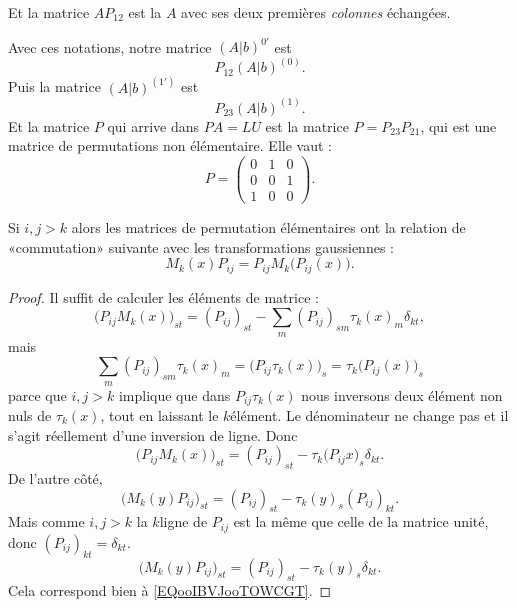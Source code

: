 Et la matrice \( AP_{12}\) est la \( A\) avec ses deux premières \emph{colonnes} échangées.

Avec ces notations, notre matrice \( (A|b)^{0'}\) est
\begin{equation}
	P_{12}(A|b)^{(0)}.
\end{equation}
Puis la matrice \( (A|b)^{(1')}\) est
\begin{equation}
	P_{23}(A|b)^{(1)}.
\end{equation}
Et la matrice \( P\) qui arrive dans \( PA=LU\) est la matrice \(P= P_{23}P_{21}\), qui est une matrice de permutations non élémentaire. Elle vaut :
\begin{equation}
	P=\begin{pmatrix}
		0 & 1 & 0 \\
		0 & 0 & 1 \\
		1 & 0 & 0
	\end{pmatrix}.
\end{equation}

\begin{lemma}        \label{LEMooYIYIooYhnaOt}
	Si \( i,j>k\) alors les matrices de permutation élémentaires ont la relation de «commutation» suivante avec les transformations gaussiennes :
	\begin{equation}
		M_k(x)P_{ij}=P_{ij}M_k\big(  P_{ij}(x) \big).
	\end{equation}
\end{lemma}

\begin{proof}
	Il suffit de calculer les éléments de matrice :
	\begin{equation}
		\big( P_{ij}M_k(x) \big)_{st}=(P_{ij})_{st}-\sum_m(P_{ij})_{sm}\tau_k(x)_{m}\delta_{kt},
	\end{equation}
	mais
	\begin{equation}
		\sum_m(P_{ij})_{sm}\tau_k(x)_{m}=\big( P_{ij}\tau_k(x) \big)_s=\tau_k\big( P_{ij}(x) \big)_s
	\end{equation}
	parce que \( i,j>k\) implique que dans \( P_{ij}\tau_k(x)\) nous inversons deux élément non nuls de \( \tau_k(x)\), tout en laissant le \( k\)\ieme élément. Le dénominateur ne change pas et il s'agit réellement d'une inversion de ligne. Donc
	\begin{equation}        \label{EQooIBVJooTOWCGT}
		\big( P_{ij}M_k(x) \big)_{st}=(P_{ij})_{st}-\tau_k\big( P_{ij}x \big)_s\delta_{kt}.
	\end{equation}
	De l'autre côté,
	\begin{equation}
		\big( M_k(y)P_{ij} \big)_{st}=(P_{ij})_{st}-\tau_k(y)_s(P_{ij})_{kt}.
	\end{equation}
	Mais comme \( i,j>k\) la \( k\)\ieme ligne de \( P_{ij}\) est la même que celle de la matrice unité, donc \( (P_{ij})_{kt}=\delta_{kt}\).
	\begin{equation}
		\big( M_k(y)P_{ij} \big)_{st}=(P_{ij})_{st}-\tau_k(y)_s\delta_{kt}.
	\end{equation}
	Cela correspond bien à \eqref{EQooIBVJooTOWCGT}.
\end{proof}

